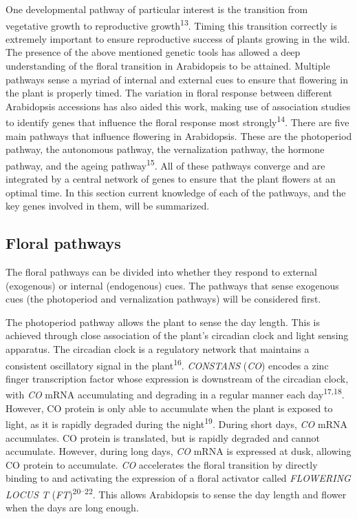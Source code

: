 \documentclass[12pt,]{book}
\begin{document}
One developmental pathway of particular interest is the transition from
vegetative growth to reproductive growth\textsuperscript{13}. Timing
this transition correctly is extremely important to ensure reproductive
success of plants growing in the wild. The presence of the above
mentioned genetic tools has allowed a deep understanding of the floral
transition in Arabidopsis to be attained. Multiple pathways sense a
myriad of internal and external cues to ensure that flowering in the
plant is properly timed. The variation in floral response between
different Arabidopsis accessions has also aided this work, making use of
association studies to identify genes that influence the floral response
most strongly\textsuperscript{14}. There are five main pathways that
influence flowering in Arabidopsis. These are the photoperiod pathway,
the autonomous pathway, the vernalization pathway, the hormone pathway,
and the ageing pathway\textsuperscript{15}. All of these pathways
converge and are integrated by a central network of genes to ensure that
the plant flowers at an optimal time. In this section current knowledge
of each of the pathways, and the key genes involved in them, will be
summarized.

\subsection{Floral pathways}\label{floral-pathways}

The floral pathways can be divided into whether they respond to external
(exogenous) or internal (endogenous) cues. The pathways that sense
exogenous cues (the photoperiod and vernalization pathways) will be
considered first.

The photoperiod pathway allows the plant to sense the day length. This
is achieved through close association of the plant's circadian clock and
light sensing apparatus. The circadian clock is a regulatory network
that maintains a consistent oscillatory signal in the
plant\textsuperscript{16}. \emph{CONSTANS} (\emph{CO}) encodes a zinc
finger transcription factor whose expression is downstream of the
circadian clock, with \emph{CO} mRNA accumulating and degrading in a
regular manner each day\textsuperscript{17,18}. However, CO protein is
only able to accumulate when the plant is exposed to light, as it is
rapidly degraded during the night\textsuperscript{19}. During short
days, \emph{CO} mRNA accumulates. CO protein is translated, but is
rapidly degraded and cannot accumulate. However, during long days,
\emph{CO} mRNA is expressed at dusk, allowing CO protein to accumulate.
\emph{CO} accelerates the floral transition by directly binding to and
activating the expression of a floral activator called \emph{FLOWERING
LOCUS T} (\emph{FT})\textsuperscript{20--22}. This allows Arabidopsis to
sense the day length and flower when the days are long enough.
\end{document}
